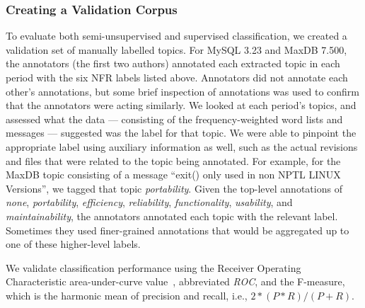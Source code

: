 \documentclass[smallextended]{svjour3}       %
\begin{document}

\subsubsection{Creating a Validation Corpus}
To evaluate both semi-unsupervised and supervised classification, we
created a validation set of manually labelled topics. For MySQL 3.23
and MaxDB 7.500, the annotators (the first two authors) annotated each extracted topic in each period with
the six NFR labels listed above.
Annotators did not annotate each other's annotations, but some brief
inspection of annotations was used to confirm that the annotators were
acting similarly.
We looked at each period's topics, and assessed what the data ---
consisting of the frequency-weighted word lists and messages ---
suggested was the label for that topic. 
We were able to pinpoint the appropriate label using auxiliary information as well, such as the actual revisions and files that were related to the
topic being annotated.
For example, for the MaxDB topic consisting of a message ``exit() only
used in non NPTL LINUX Versions'', we tagged that topic
\emph{portability}. 
Given the top-level annotations of \emph{none}, \emph{portability},
\emph{efficiency}, \emph{reliability}, \emph{functionality},
\emph{usability}, and \emph{maintainability}, the annotators annotated each topic
with the relevant label. Sometimes they used finer-grained
annotations that would be aggregated up to one of these higher-level labels.

We validate classification performance using the Receiver Operating
Characteristic area-under-curve value~\cite{Fawcett2006861},
abbreviated \emph{ROC}, and the F-measure, which is the harmonic mean of precision and recall, i.e., $2 * (P * R) / (P + R)$. 
\end{document}
